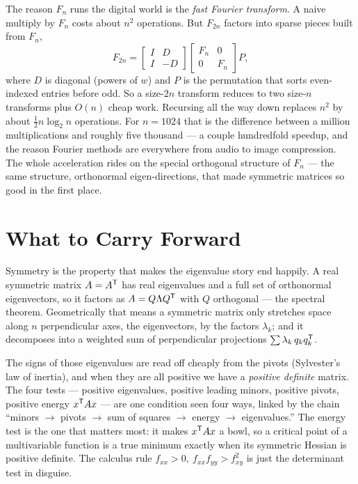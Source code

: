 The reason $F_n$ runs the digital world is the \emph{fast Fourier transform}. A naive multiply by $F_n$ costs about $n^2$ operations. But $F_{2n}$ factors into sparse pieces built from $F_n$,
\[
   F_{2n}=\begin{bmatrix} I & D\\ I & -D\end{bmatrix}
          \begin{bmatrix} F_n & 0\\ 0 & F_n\end{bmatrix} P,
\]
where $D$ is diagonal (powers of $w$) and $P$ is the permutation that sorts even-indexed entries before odd. So a size-$2n$ transform reduces to two size-$n$ transforms plus $O(n)$ cheap work. Recursing all the way down replaces $n^2$ by about $\tfrac12 n\log_2 n$ operations. For $n=1024$ that is the difference between a million multiplications and roughly five thousand --- a couple hundredfold speedup, and the reason Fourier methods are everywhere from audio to image compression. The whole acceleration rides on the special orthogonal structure of $F_n$ --- the same structure, orthonormal eigen-directions, that made symmetric matrices so good in the first place.

\section{What to Carry Forward}

Symmetry is the property that makes the eigenvalue story end happily. A real symmetric matrix $A=A^{\mathsf T}$ has real eigenvalues and a full set of orthonormal eigenvectors, so it factors as $A=Q\Lambda Q^{\mathsf T}$ with $Q$ orthogonal --- the spectral theorem. Geometrically that means a symmetric matrix only stretches space along $n$ perpendicular axes, the eigenvectors, by the factors $\lambda_k$; and it decomposes into a weighted sum of perpendicular projections $\sum\lambda_k\,q_kq_k^{\mathsf T}$.

The signs of those eigenvalues are read off cheaply from the pivots (Sylvester's law of inertia), and when they are all positive we have a \emph{positive definite} matrix. The four tests --- positive eigenvalues, positive leading minors, positive pivots, positive energy $x^{\mathsf T} Ax$ --- are one condition seen four ways, linked by the chain ``minors $\to$ pivots $\to$ sum of squares $\to$ energy $\to$ eigenvalues.'' The energy test is the one that matters most: it makes $x^{\mathsf T} Ax$ a bowl, so a critical point of a multivariable function is a true minimum exactly when its symmetric Hessian is positive definite. The calculus rule $f_{xx}>0,\ f_{xx}f_{yy}>f_{xy}^2$ is just the determinant test in disguise.

